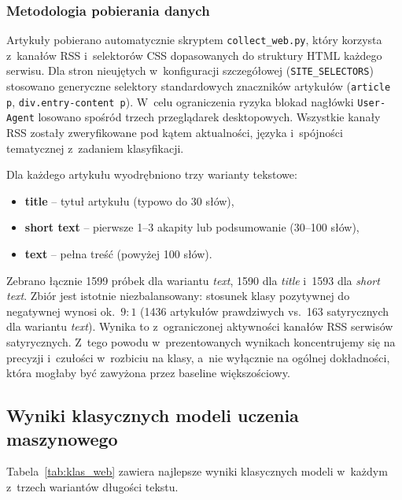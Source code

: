\documentclass[oneside,polski,logo]{amuthesis}
\begin{document}
\subsubsection*{Metodologia pobierania danych}

Artykuły pobierano automatycznie skryptem \texttt{collect\_web.py},
który korzysta z~kanałów RSS i~selektorów CSS dopasowanych do struktury
HTML każdego serwisu. Dla stron nieujętych w~konfiguracji szczegółowej
(\texttt{SITE\_SELECTORS}) stosowano generyczne selektory standardowych
znaczników artykułów (\texttt{article p}, \texttt{div.entry-content p}).
W~celu ograniczenia ryzyka blokad nagłówki \texttt{User-Agent} losowano
spośród trzech przeglądarek desktopowych. Wszystkie kanały RSS
zostały zweryfikowane pod kątem aktualności, języka i~spójności
tematycznej z~zadaniem klasyfikacji.

Dla każdego artykułu wyodrębniono trzy warianty tekstowe:
\begin{itemize}
  \item \textbf{title} -- tytuł artykułu (typowo do 30 słów),
  \item \textbf{short text} -- pierwsze 1--3 akapity lub podsumowanie (30--100 słów),
  \item \textbf{text} -- pełna treść (powyżej 100 słów).
\end{itemize}

Zebrano łącznie 1599 próbek dla wariantu \emph{text},
1590 dla \emph{title} i~1593 dla \emph{short text}. Zbiór jest
istotnie niezbalansowany: stosunek klasy pozytywnej do negatywnej
wynosi ok.\ \(9{:}1\) (1436 artykułów prawdziwych vs.\ 163 satyrycznych
dla wariantu \emph{text}). Wynika to z~ograniczonej aktywności
kanałów RSS serwisów satyrycznych. Z~tego powodu w~prezentowanych
wynikach koncentrujemy się na precyzji i~czułości w~rozbiciu na klasy,
a~nie wyłącznie na ogólnej dokładności, która mogłaby być zawyżona
przez baseline większościowy.

\subsection{Wyniki klasycznych modeli uczenia maszynowego}
\label{sec:wyniki_www_klasyczne}

Tabela~\ref{tab:klas_web} zawiera najlepsze wyniki klasycznych
modeli w~każdym z~trzech wariantów długości tekstu.
\end{document}
